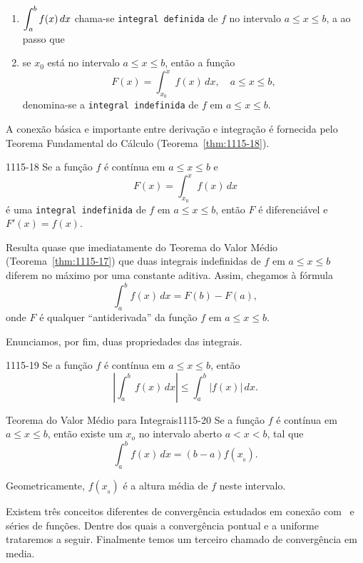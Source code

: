 \begin{enumerate}[label=(\alph*),leftmargin=2.0cm]
\item  $\displaystyle{\int_a^b f(x)\, dx}$ chama-se \texttt{integral definida} de $f$ no intervalo $a \le x \le b$, a ao passo que
\item  se $x_{0}$ está no intervalo $a \le x \le b$, então a função
\begin{equation*}
  F(x)= \int_{x_{0}}^{x} f(x)\, dx,\quad a \le x \le b,
\end{equation*}
denomina-se a \texttt{integral indefinida} de $f$ em $a \le x \le b$.
\end{enumerate}

A conexão básica e importante entre derivação e integração é fornecida pelo Teorema Fundamental 
do Cálculo (Teorema~\ref{thm:1115-18}).

\begin{theoc}{}{1115-18} Se a função $f$ é contínua em $a \le x \le b$ e
\begin{equation*}
  F(x) = \int_{x_{0}}^x f(x)\, dx
\end{equation*}
é uma \texttt{integral indefinida} de $f$ em $a \le x \le b$, então $F$ é diferenciável e $F'(x) = f(x)$.
\end{theoc}

Resulta quase que imediatamente do Teorema do Valor Médio (Teorema~\ref{thm:1115-17}) que duas integrais indefinidas de $f$ em $a \le x \le b$ diferem no máximo por uma constante aditiva. Assim, chegamos  à fórmula
\begin{equation*}
\int_a^b f(x)\, dx = F(b) - F(a),
\end{equation*}
onde $F$ é qualquer ``antiderivada'' da função $f$ em $a \le x \le b$.

Enunciamos, por fim, duas propriedades das integrais.

\begin{theoc}{}{1115-19} Se a função $f$ é contínua em $a \le x \le b$, então
\begin{equation*}
  \left|\int_a^b\,f(x)\, dx  \right|\leq \int_a^b |f(x)|\, dx.
\end{equation*}
\end{theoc}

\begin{theoc}{Teorema do Valor Médio para Integrais}{1115-20} 
Se a função $f$ é contínua em $a \le x \le b$, então existe um $x_o$ no intervalo aberto $a < x < b$, tal que
\begin{equation*}
  \int_a^b f(x)\, dx = (b - a)f(x_{_{0}}).
\end{equation*}
\end{theoc}

Geometricamente, $f(x_{_{0}})$ é a altura média de $f$ neste intervalo.

Existem três conceitos diferentes de convergência estudados em conexão com \seq\ e séries de funções. Dentre dos quais a convergência pontual e a uniforme trataremos 
a seguir. Finalmente temos um terceiro chamado de convergência em media.
